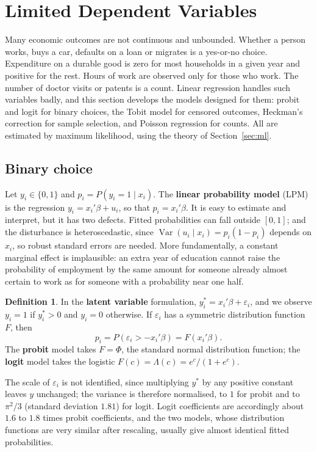 \documentclass[11pt,a4paper]{article}
\numberwithin{equation}{section}
\DeclareMathOperator{\Var}{Var}
\theoremstyle{definition}
\newtheorem{defn}[thm]{Definition}
\begin{document}
\section{Limited Dependent Variables}
\label{sec:ldv}

Many economic outcomes are not continuous and unbounded. Whether a person works, buys a car, defaults on a loan or migrates is a yes-or-no choice.
Expenditure on a durable good is zero for most households in a given year and positive for the rest. Hours of work are observed only for those
who work. The number of doctor visits or patents is a count. Linear regression handles such variables badly, and this section develops the models
designed for them: probit and logit for binary choices, the Tobit model for censored outcomes, Heckman's correction for sample selection, and
Poisson regression for counts. All are estimated by maximum likelihood, using the theory of Section~\ref{sec:ml}.

\subsection{Binary choice}
\label{ssec:binary}

Let $y_i \in \{0, 1\}$ and $p_i = P(y_i = 1 \mid x_i)$. The \textbf{linear probability model} (LPM) is the regression $y_i = x_i'\beta + u_i$, so that $p_i = x_i'\beta$. It is easy to
estimate and interpret, but it has two defects. Fitted probabilities can fall outside $[0, 1]$; and the disturbance is heteroscedastic, since
$\Var(u_i \mid x_i) = p_i(1 - p_i)$ depends on $x_i$, so robust standard errors are needed. More fundamentally, a constant marginal effect is implausible: an extra
year of education cannot raise the probability of employment by the same amount for someone already almost certain to work as for someone with a
probability near one half.

\begin{defn}
In the \textbf{latent variable} formulation, $y_i^* = x_i'\beta + \varepsilon_i$, and we observe $y_i = 1$ if $y_i^* > 0$ and $y_i = 0$ otherwise. If $\varepsilon_i$ has a symmetric distribution
function $F$, then
\[
p_i = P(\varepsilon_i > -x_i'\beta) = F(x_i'\beta) .
\]
The \textbf{probit} model takes $F = \Phi$, the standard normal distribution function; the \textbf{logit} model takes the logistic $F(c) = \Lambda(c) = e^c/(1 + e^c)$.
\end{defn}

The scale of $\varepsilon_i$ is not identified, since multiplying $y^*$ by any positive constant leaves $y$ unchanged; the variance is therefore normalised, to $1$ for
probit and to $\pi^2/3$ (standard deviation $1.81$) for logit. Logit coefficients are accordingly about $1.6$ to $1.8$ times probit coefficients, and the two models,
whose distribution functions are very similar after rescaling, usually give almost identical fitted probabilities.
\end{document}
